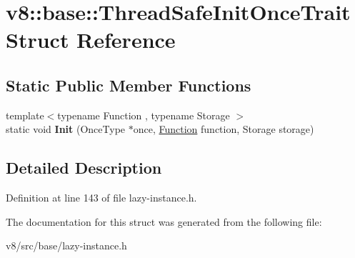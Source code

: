 \hypertarget{structv8_1_1base_1_1ThreadSafeInitOnceTrait}{}\section{v8\+:\+:base\+:\+:Thread\+Safe\+Init\+Once\+Trait Struct Reference}
\label{structv8_1_1base_1_1ThreadSafeInitOnceTrait}
\subsection*{Static Public Member Functions}
\begin{DoxyCompactItemize}
\item 
\mbox{\label{structv8_1_1base_1_1ThreadSafeInitOnceTrait_ac14ff68670250c50c27a2841abf6ad34}} 
{\footnotesize template$<$typename Function , typename Storage $>$ }\\static void {\bfseries Init} (Once\+Type $\ast$once, \mbox{\hyperlink{classv8_1_1Function}{Function}} function, Storage storage)
\end{DoxyCompactItemize}


\subsection{Detailed Description}


Definition at line 143 of file lazy-\/instance.\+h.



The documentation for this struct was generated from the following file\+:\begin{DoxyCompactItemize}
\item 
v8/src/base/lazy-\/instance.\+h\end{DoxyCompactItemize}
